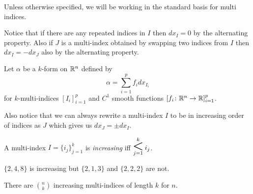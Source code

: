 \documentclass[notes]{subfiles}
\begin{document}
Unless otherwise specified, we will be working in the standard basis for multi indices.

Notice that if there are any repeated indices in $I$ then $dx_I = 0$ by the alternating property. Also if $J$ is a multi-index obtained by swapping two indices from $I$ then $dx_I = -dx_J$ also by the alternating property.

\begin{example}
    Let $\alpha$ be a $k$-form on $\mathbb{R}^n$ defined by
    \[
        \alpha = \sum_{i = 1}^p f_i dx_{I_i}
    \]
    for $k$-multi-indices $[I_i]_{i = 1}^p$ and $C^1$ smooth functions $[f_i\colon \mathbb{R}^n \to \mathbb{R}]_{i = 1}^p$.
\end{example}

Also notice that we can always rewrite a multi-index $I$ to be in increasing order of indices as $J$ which gives us $dx_J = \pm dx_I$.

\begin{definition}
    A multi-index $I = \{ i_j \}_{j = 1}^k$ is \textit{increasing} iff $\mathop{\scalebox{2}{\textless}}\limits_{j = 1}^{k} i_j$.
\end{definition}

\begin{example}
    $\{ 2, 4, 8 \}$ is increasing but $\{ 2, 1, 3 \}$ and $\{ 2, 2, 2 \}$ are not.
\end{example}

\begin{lemma}
    There are ${n \choose k}$ increasing multi-indices of length $k$ for $n$.
\end{lemma}
\end{document}
